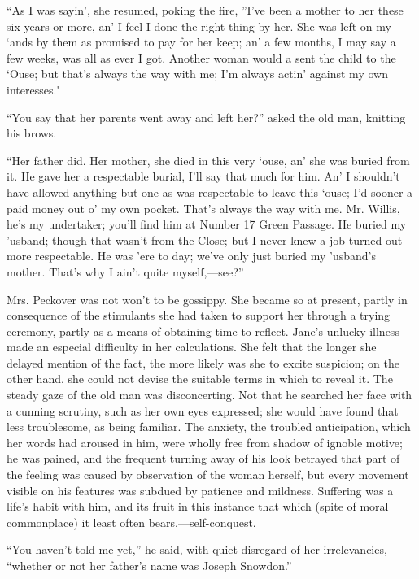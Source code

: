 ``As I was sayin', she resumed, poking the fire, ''I've been a mother to
her these six years or more, an' I feel I done the right thing by her.
She was left on my `ands by them as promised to pay for her keep; an' a
few months, I may say a few weeks, was all as ever I got. Another woman
would a sent the child to the `Ouse; but that's always the way with me;
I'm always actin' against my own interesses."

{}``You say that her parents went away and left her?'' asked the old
man, knitting his brows.

``Her father did. Her mother, she died in this very `ouse, an' she was
buried from it. He gave her a respectable burial, I'll say that much for
him. An' I shouldn't have allowed anything but one as was respectable to
leave this `ouse; I'd sooner a paid money out o' my own pocket. That's
always the way with me. Mr. Willis, he's my undertaker; you'll find him
at Number 17 Green Passage. He buried my 'usband; though that wasn't
from the Close; but I never knew a job turned out more respectable. He
was 'ere to day; we've only just buried my 'usband's mother. That's why
I ain't quite myself,---see?''

Mrs. Peckover was not won't to be gossippy. She became so at present,
partly in consequence of the stimulants she had taken to support her
through a trying ceremony, partly as a means of obtaining time to
reflect. Jane's unlucky illness made an especial {}difficulty in her
calculations. She felt that the longer she delayed mention of the fact,
the more likely was she to excite suspicion; on the other hand, she
could not devise the suitable terms in which to reveal it. The steady
gaze of the old man was disconcerting. Not that he searched her face
with a cunning scrutiny, such as her own eyes expressed; she would have
found that less troublesome, as being familiar. The anxiety, the
troubled anticipation, which her words had aroused in him, were wholly
free from shadow of ignoble motive; he was pained, and the frequent
turning away of his look betrayed that part of the feeling was caused by
observation of the woman herself, but every movement visible on his
features was subdued by patience and mildness. Suffering was a life's
habit with him, and its fruit in this instance that which (spite of
moral commonplace) it least often bears,---self-conquest.

``You haven't told me yet,'' he said, with quiet disregard of her
irrelevancies, ``whether or not her father's name was Joseph Snowdon.''

